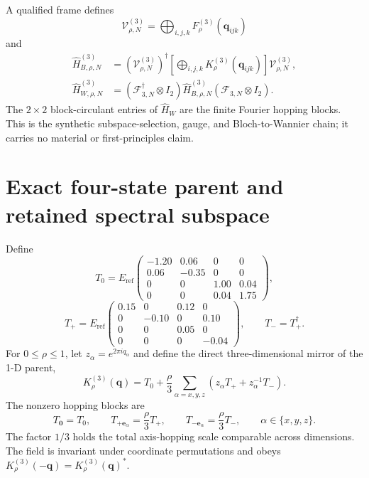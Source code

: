 \documentclass[11pt]{article}
\begin{document}
A qualified frame defines
\begin{equation}
 \mathcal V_{\rho,N}^{(3)}=\bigoplus_{i,j,k}F_\rho^{(3)}(\mathbf q_{ijk})
\end{equation}
and
\begin{align}
 \widehat H_{B,\rho,N}^{(3)}
 &=(\mathcal V_{\rho,N}^{(3)})^\dagger
 \left[\bigoplus_{i,j,k}K_\rho^{(3)}(\mathbf q_{ijk})\right]
 \mathcal V_{\rho,N}^{(3)},\label{eq:retained-direct-sum}\\
 \widehat H_{W,\rho,N}^{(3)}
 &=(\mathcal F_{3,N}^\dagger\otimes I_2)
 \widehat H_{B,\rho,N}^{(3)}
 (\mathcal F_{3,N}\otimes I_2).
 \label{eq:wannier-transform}
\end{align}
The $2\times2$ block-circulant entries of $\widehat H_W$ are the finite Fourier hopping
blocks. This is the synthetic subspace-selection, gauge, and Bloch-to-Wannier chain; it
carries no material or first-principles claim.

\section{Exact four-state parent and retained spectral subspace}

Define
\begin{equation}
 T_0=E_{\mathrm{ref}}
 \begin{pmatrix}
 -1.20&0.06&0&0\\
 0.06&-0.35&0&0\\
 0&0&1.00&0.04\\
 0&0&0.04&1.75
 \end{pmatrix},
\end{equation}
\begin{equation}
 T_+=E_{\mathrm{ref}}
 \begin{pmatrix}
 0.15&0&0.12&0\\
 0&-0.10&0&0.10\\
 0&0&0.05&0\\
 0&0&0&-0.04
 \end{pmatrix},
 \qquad T_-=T_+^\dagger.
\end{equation}
For $0\le\rho\le1$, let $z_\alpha=e^{2\pi iq_\alpha}$ and define the direct
three-dimensional mirror of the 1-D parent,
\begin{equation}
 K_\rho^{(3)}(\mathbf q)
 =T_0+\frac\rho3\sum_{\alpha=x,y,z}
 \left(z_\alpha T_+ +z_\alpha^{-1}T_-\right).
 \label{eq:parent}
\end{equation}
The nonzero hopping blocks are
\begin{equation}
 T_{\mathbf0}=T_0,
 \qquad T_{+\mathbf e_\alpha}=\frac\rho3T_+,
 \qquad T_{-\mathbf e_\alpha}=\frac\rho3T_-,
 \qquad \alpha\in\{x,y,z\}.
\end{equation}
The factor $1/3$ holds the total axis-hopping scale comparable across dimensions. The
field is invariant under coordinate permutations and obeys
$K_\rho^{(3)}(-\mathbf q)=K_\rho^{(3)}(\mathbf q)^*$.
\end{document}
